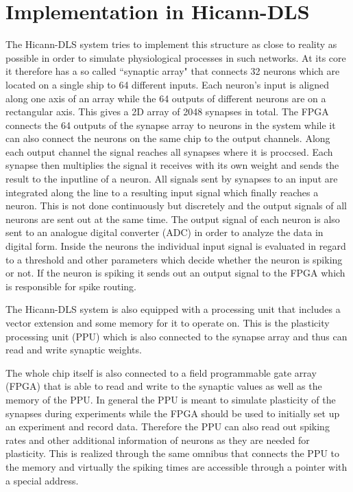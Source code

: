 \section{Implementation in Hicann-DLS}
The Hicann-DLS system tries to implement this structure as close to reality as possible in order to simulate physiological processes in such networks.
At its core it therefore has a so called ``synaptic array" that connects 32 neurons which are located on a single ship to 64 different inputs.
Each neuron's input is aligned along one axis of an array while the 64 outputs of different neurons are on a rectangular axis.
This gives a 2D array of 2048 synapses in total.
The FPGA connects the 64 outputs of the synapse array to neurons in the system while it can also connect the neurons on the same chip to the output channels.
Along each output channel the signal reaches all synapses where it is proccsed.
Each synapse then multiplies the signal it receives with its own weight and sends the result to the inputline of a neuron.
All signals sent by synapses to an input are integrated along the line to a resulting input signal which finally reaches a neuron.
This is not done continuously but discretely and the output signals of all neurons are sent out at the same time.
The output signal of each neuron is also sent to an analogue digital converter (ADC) in order to analyze the data in digital form.
Inside the neurons the individual input signal is evaluated in regard to a threshold and other parameters which decide whether the neuron is spiking or not.
If the neuron is spiking it sends out an output signal to the FPGA which is responsible for spike routing.

The Hicann-DLS system is also equipped with a processing unit that includes a vector extension and some memory for it to operate on.
This is the plasticity processing unit (PPU) which is also connected to the synapse array and thus can read and write synaptic weights.

The whole chip itself is also connected to a field programmable gate array (FPGA) that is able to read and write to the synaptic values as well as the memory of the PPU.
In general the PPU is meant to simulate plasticity of the synapses during experiments while the FPGA should be used to initially set up an experiment and record data.
Therefore the PPU can also read out spiking rates and other additional information of neurons as they are needed for plasticity.
This is realized through the same omnibus that connects the PPU to the memory and virtually the spiking times are accessible through a pointer with a special address.

